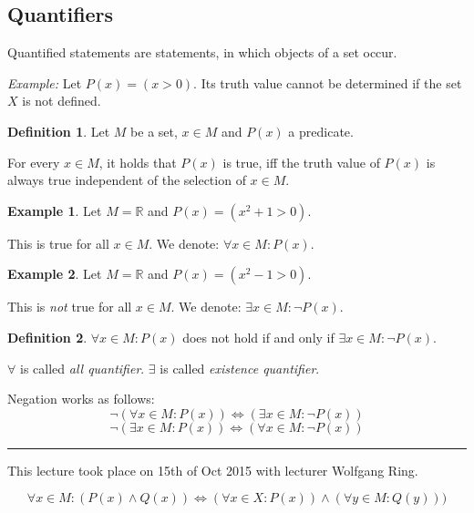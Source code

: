 \documentclass[a4paper,landscape,twocolumn]{article}
\theoremstyle{definition}
\newtheorem{defi}{Definition}
\newtheorem{ex}{Example}
\newcommand\meta[3]{\hrule{} This #1 took place on #2 with lecturer #3.\par}
\begin{document}
\subsection{Quantifiers}
%
Quantified statements are statements, in which objects of a set occur.

\emph{Example:} Let $P(x) = (x > 0)$. Its truth value cannot be determined
if the set $X$ is not defined.

\begin{defi}
  Let $M$ be a set, $x \in M$ and $P(x)$ a predicate.

  For every $x \in M$, it holds that $P(x)$ is true,
  iff the truth value of $P(x)$ is always true independent of the selection of $x \in M$.
\end{defi}

\begin{ex}
  Let $M = \mathbb R$ and $P(x) = (x^2 + 1 > 0)$.

  This is true for all $x \in M$.
  We denote: $\forall x \in M: P(x)$.
\end{ex}

\begin{ex}
  Let $M = \mathbb R$ and $P(x) = (x^2 - 1 > 0)$.

  This is \emph{not} true for all $x \in M$.
  We denote: $\exists x \in M: \neg P(x)$.
\end{ex}

\begin{defi}
  $\forall x \in M: P(x)$ does not hold if and only if $\exists x \in M: \neg P(x)$.

  $\forall$ is called \emph{all quantifier}.
  $\exists$ is called \emph{existence quantifier}.

  Negation works as follows:
  \[ \neg\left(\forall x \in M: P(x)\right) \iff \left(\exists x \in M: \neg P(x)\right) \]
  \[ \neg\left(\exists x \in M: P(x)\right) \iff \left(\forall x \in M: \neg P(x)\right) \]
\end{defi}


\meta{lecture}{15th of Oct 2015}{Wolfgang Ring}

\[ \forall x \in M: (P(x) \land Q(x)) \iff (\forall x \in X: P(x)) \land (\forall y \in M: Q(y))) \]
\end{document}
